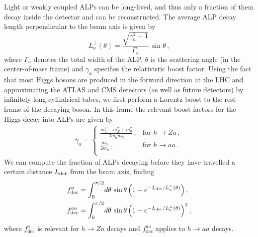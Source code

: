 Light or weakly coupled ALPs can be long-lived, and thus only a fraction of them decay inside the detector and can be reconstructed. The average ALP decay length perpendicular to the beam axis is given by
%
\begin{equation}\label{eq:Lperp}
   L_a^\perp(\theta) = \frac{\sqrt{\gamma_a^2 - 1}}{\Gamma_a}\,\sin\theta \,, 
\end{equation}
%
where $\Gamma_a$ denotes the total width of the ALP, $\theta$ is the scattering angle (in the center-of-mass frame) and $\gamma_a$ specifies the relativistic boost factor. Using the fact that most Higgs bosons are produced in the forward direction at the LHC and approximating the ATLAS and CMS detectors (as well as future detectors) by infinitely long cylindrical tubes, we first perform a Lorentz boost to the rest frame of the decaying boson. In this frame the relevant boost factors for the Higgs decay into ALPs are given by
\begin{align}
\gamma_a=\begin{cases}\displaystyle{ \frac{m_h^2-m_Z^2+m_a^2}{2m_am_h}}\,,& \text{for}\,\, h \to Z a\,,\\[14pt]
\displaystyle \frac{m_h}{2m_a}\,,&\text{for}\,\, h \to aa\,.\\
\end{cases}
\end{align}
%
We can compute the fraction of ALPs decaying before they have travelled a certain distance $L_{\rm det}$ from the beam axis, finding 
%
\begin{equation}\label{eq:ffactors}
\begin{aligned}
   f_{\rm dec}^{a} &= \int_0^{\pi/2}\!d\theta \,  \sin\theta
    \left( 1 - e^{-L_{\rm det}/L_a^\perp(\theta)} \right) , \\
   f_{\rm dec}^{aa} &= \int_0^{\pi/2}\!d\theta \,  \sin\theta
    \left( 1 - e^{-L_{\rm det}/L_a^\perp(\theta)} \right)^2,
\end{aligned}
\end{equation} 
%
where $f^a_\text{dec}$ is relevant for $h \to Z a$ decays and $f^{aa}_\text{dec}$ applies to $h\to aa$ decays. 

